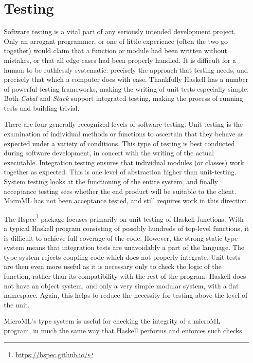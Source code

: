 \documentclass[12pt, a4paper]{report}
\begin{document}
\chapter{Testing}
\label{testing}
Software testing is a vital part of any seriously intended development project. Only an arrogant
programmer, or one of little experience (often the two go together) would claim that a function or
module had been written without mistakes, or that all edge cases had been properly handled. It is
difficult for a human to be ruthlessly systematic: precisely the approach that testing needs, and
precisely that which a computer does with ease. Thankfully Haskell has a number of powerful testing
frameworks, making the writing of unit tests especially simple. Both \textit{Cabal} and
\textit{Stack} support integrated testing, making the process of running tests and building trivial.

There are four generally recognized levels of software testing. Unit testing is the examination of
individual methods or functions to ascertain that they behave as expected under a variety of
conditions. This type of testing is best conducted during software development, in concert with the
writing of the actual executable. Integration testing ensures that individual modules (or
classes) work together as expected. This is one level of abstraction higher than unit-testing.
System testing looks at the functioning of the entire system, and finally acceptance testing sees
whether the end product will be suitable to the client. MicroML has not been acceptance tested, and
still requires work in this direction.

The Hspec\footnote{\url{https://hspec.github.io/}} package focuses primarily on unit testing of
Haskell functions. With a typical Haskell program consisting of possibly hundreds of top-level
functions, it is difficult to achieve full coverage of the code. However, the strong static type
system means that integration tests are unavoidably a part of the language. The type system rejects
coupling code which does not properly integrate. Unit tests are then even more useful as it is
necessary only to check the logic of the function, rather than its compatibility with the rest of
the program. Haskell does not have an object system, and only a very simple modular system, with a
flat namespace. Again, this helps to reduce the necessity for testing above the level of the unit.

MicroML's type system is useful for checking the integrity of a microML program, in much the same
way that Haskell performs and enforces such checks. 
\end{document}
